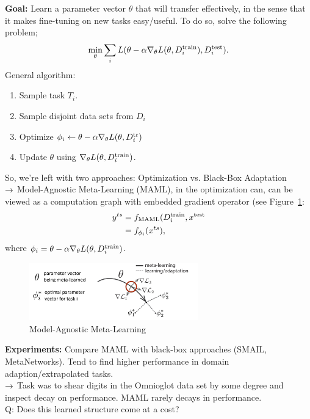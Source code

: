 {\bf Goal:} Learn a parameter vector $\theta$ that will transfer effectively, in the sense that it makes fine-tuning on new tasks easy/useful. To do so, solve the following problem;
\[
\min_\theta \sum_i L(\theta - \alpha \nabla_\theta L(\theta, D_i^{\text{train}}), D_i^{\text{test}}).
\]
General algorithm:
\begin{enumerate}
\item Sample task $T_i$.
\item Sample disjoint data sets from $D_i$
\item Optimize $\phi_i \leftarrow \theta - \alpha \nabla_\theta L(\theta, D_i^{\text{tr}})$
\item Update $\theta$ using $\nabla_\theta L(\theta, D_i^{\text{train}})$.
\end{enumerate}

So, we're left with two approaches: Optimization vs. Black-Box Adaptation \\

$\rightarrow$ Model-Agnostic Meta-Learning (MAML), in the optimization can, can be viewed as a computation graph with embedded gradient operator (see Figure~\ref{fig:maml}:
\begin{align}
 y^{ts} &= f_{\text{MAML}}(D_i^{\text{train}}, x^{\text{test}} \\
 &= f_{\phi_i}(x^{ts}),
\end{align}
where $\phi_i = \theta - \alpha \nabla_\theta L(\theta, D_i^{\text{train}})$. \\

\begin{figure}
    \centering
    \includegraphics[width=0.65\textwidth]{images/maml.jpg}
    \caption{Model-Agnostic Meta-Learning}
    \label{fig:maml}
\end{figure}


{\bf Experiments:} Compare MAML with black-box approaches (SMAIL, MetaNetworks). Tend to find higher performance in domain adaption/extrapolated tasks. \\
$\rightarrow$ Task was to shear digits in the Omnioglot data set by some degree and inspect decay on performance. MAML rarely decays in performance. \\

Q: Does this learned structure come at a cost? \\

